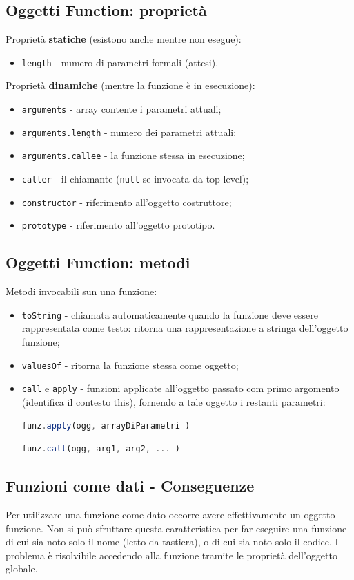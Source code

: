 \documentclass{article}
\begin{document}
\subsection{Oggetti Function: proprietà}
Proprietà \textbf{statiche} (esistono anche mentre non esegue):
\begin{itemize}
    \item \texttt{length} - numero di parametri formali (attesi).
\end{itemize}
Proprietà \textbf{dinamiche} (mentre la funzione è in esecuzione):
\begin{itemize}
    \item \texttt{arguments} - array contente i parametri attuali;
    \item \texttt{arguments.length} - numero dei parametri attuali;
    \item \texttt{arguments.callee} - la funzione stessa in esecuzione;
    \item \texttt{caller} - il chiamante (\texttt{null} se invocata da top level);
    \item \texttt{constructor} - riferimento all'oggetto costruttore;
    \item \texttt{prototype} - riferimento all'oggetto prototipo.
\end{itemize}
\subsection{Oggetti Function: metodi}
Metodi invocabili sun una funzione:
\begin{itemize}
    \item \texttt{toString} - chiamata automaticamente quando la funzione deve essere rappresentata come testo: ritorna una rappresentazione a stringa dell'oggetto funzione;
    \item \texttt{valuesOf} - ritorna la funzione stessa come oggetto;
    \item \texttt{call} e \texttt{apply} - funzioni applicate all'oggetto passato com primo argomento (identifica il contesto this), fornendo a tale oggetto i restanti parametri:
          \begin{lstlisting}[language=JavaScript]
    funz.apply(ogg, arrayDiParametri )
    \end{lstlisting}
          \begin{lstlisting}[language=JavaScript]
    funz.call(ogg, arg1, arg2, ... )
    \end{lstlisting}
\end{itemize}
\subsection{Funzioni come dati - Conseguenze}
Per utilizzare una funzione come dato occorre avere effettivamente un oggetto funzione. Non si può sfruttare questa caratteristica per far eseguire una funzione di cui sia noto solo il nome (letto da tastiera),
o di cui sia noto solo il codice. Il problema è risolvibile accedendo alla funzione tramite le proprietà dell'oggetto globale.
\end{document}
